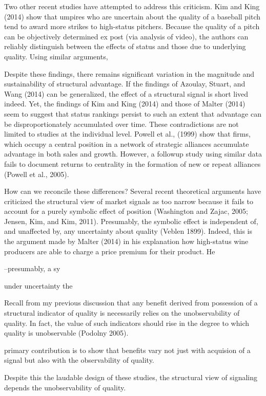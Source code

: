 Two other recent studies have attempted to address this criticism. Kim and King (2014) show that umpires who are uncertain about the quality of a baseball pitch tend to award more strikes to high-status pitchers. Because the quality of a pitch can be objectively determined ex post (via analysis of video), the authors can reliably distinguish between the effects of status and those due to underlying quality. Using similar arguments, 

Despite these findings, there remains significant variation in the magnitude and sustainability of structural advantage. If the findings of Azoulay, Stuart, and Wang (2014) can be generalized, the effect of a structural signal is short lived indeed. Yet, the findings of Kim and King (2014) and those of Malter (2014) seem to suggest that status rankings persist to such an extent that advantage can be disproportionately accumulated over time. These contradictions are not limited to studies at the individual level. Powell et al., (1999) show that firms, which occupy a central position in a network of strategic alliances accumulate advantage in both sales and growth. However, a followup study using similar data fails to document returns to centrality in the formation of new or repeat alliances (Powell et al., 2005). 

How can we reconcile these differences? Several recent theoretical arguments have criticized the structural view of market signals as too narrow because it fails to account for a purely symbolic effect of position (Washington and Zajac, 2005; Jensen, Kim, and Kim, 2011). Presumably, the symbolic effect is independent of, and unaffected by, any uncertainty about quality (Veblen 1899). Indeed, this is the argument made by Malter (2014) in his explanation how high-status wine producers are able to charge a price premium for their product. He 

 --presumably, a sy

 under uncertainty    the 

 Recall from my previous discussion that any benefit derived from possession of a structural indicator of quality is necessarily relies on the unobservability of quality. In fact, the value of such indicators should rise in the degree to which quality is unobservable (Podolny 2005).
 
primary contribution is to show that benefits vary not just with acquision of a signal but also with the observability of quality.

Despite this the laudable design of these studies, the structural view of signaling depends the unobservability of quality.

